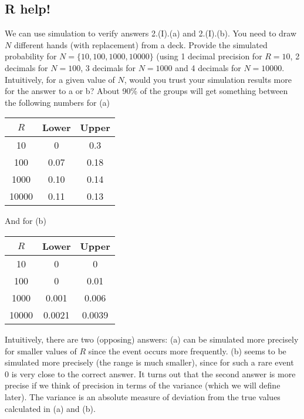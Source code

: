 \begin{exercise}
\subsection*{R help!}
We can use simulation to verify answers 2.(I).(a) and 2.(I).(b). You need to draw $N$ different hands (with replacement) from a deck. Provide the simulated probability for $N=\{10,100,1000,10000\}$  (using 1 decimal precision for $R=10$, 2 decimals for $N=100$, 3 decimals for $N=1000$ and 4 decimals for $N=10000$. Intuitively, for a given value of $N$, would you trust your simulation results more for the answer to a or b? 
	About 90\% of the groups will get something between the following numbers for (a)
\begin{center}
	\begin{tabular}{ccc}
		$R$ & Lower & Upper\\
		\midrule
		10  & 0 & 0.3\\
		100 & 0.07 & 0.18\\
		1000 & 0.10 & 0.14\\
		10000 & 0.11 & 0.13\\
	\end{tabular}
\end{center}
And for (b)
\begin{center}
	\begin{tabular}{ccc}
		$R$ & Lower & Upper\\
		\midrule
		10  & 0 & 0\\
		100 & 0 & 0.01\\
		1000 & 0.001 & 0.006\\
		10000 & 0.0021 & 0.0039\\
	\end{tabular}
\end{center}

Intuitively, there are two (opposing) answers: (a) can be simulated more precisely for smaller values of $R$ since the event occurs more frequently. (b) seems to be simulated more precisely (the range is much smaller), since for such a rare event 0 is very close to the correct answer. It turns out that the second answer is more precise if we think of precision in terms of the variance (which we will define later). The variance is an absolute measure of deviation from the true values calculated in (a) and (b). 


\end{exercise}
